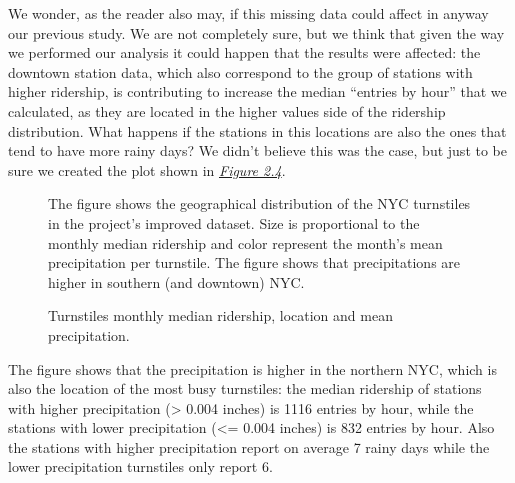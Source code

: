 \documentclass[a4paper,12pt,english]{sphinxmanual}
\begin{document}
We wonder, as the reader also may, if this missing data could affect in anyway
our previous study. We are not completely sure, but we think that given the way
we performed our analysis it could happen that the results were affected: the downtown
station data, which also correspond to the group of stations with higher ridership,
is contributing to increase the median ``entries by hour'' that we calculated, as they are
located in the higher values side of the ridership distribution. What happens if
the stations in this locations are also the ones that tend to have more rainy days?
We didn't believe this was the case, but just to be sure we created the
plot shown in {\hyperref[section1:figure24]{\emph{Figure 2.4}}}.
\begin{figure}[htbp]
\centering
\capstart

\caption{Turnstiles monthly median ridership, location and mean precipitation.}{\small 
The figure shows the geographical distribution of the NYC turnstiles in the
project's improved dataset. Size is proportional to the monthly median ridership
and color represent the month's mean precipitation per turnstile. The figure
shows that precipitations are higher in southern (and downtown) NYC.
}\label{section1:figure24}\end{figure}

The figure shows that the precipitation is higher in the northern NYC, which is
also the location of the most busy turnstiles: the median ridership of stations with
higher precipitation (\textgreater{} 0.004 inches) is 1116 entries by hour, while the stations
with lower precipitation (\textless{}= 0.004 inches) is 832 entries by hour. Also the stations
with higher precipitation report on average 7 rainy days while the lower precipitation
turnstiles only report 6.
\end{document}
